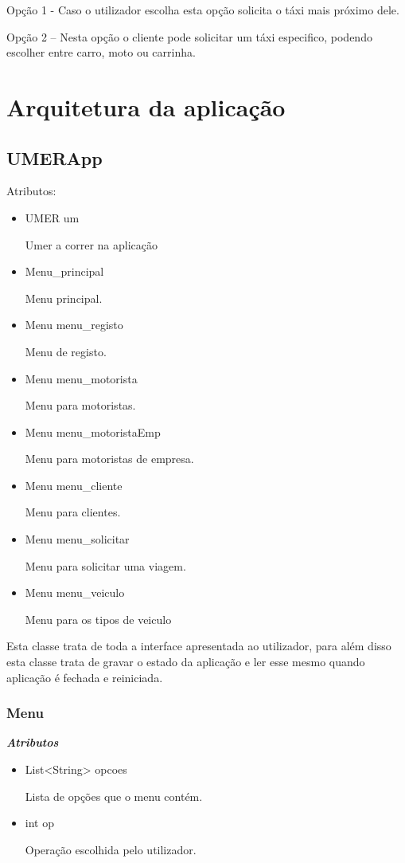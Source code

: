 \documentclass[12pt,a4paper]{report}
\begin{document}
Opção 1 - Caso o utilizador escolha esta opção solicita o táxi mais próximo dele.

Opção 2 – Nesta opção o cliente pode solicitar um táxi especifico, podendo escolher entre carro, moto ou carrinha.

\chapter{Arquitetura da aplicação}
\section{UMERApp}

Atributos:

\begin{itemize}
    \item UMER um \par
Umer a correr na aplicação
    \item Menu\_principal \par
Menu principal.
    \item Menu menu\_registo \par
Menu de registo.
    \item Menu menu\_motorista \par
Menu para motoristas.
    \item Menu menu\_motoristaEmp \par
Menu para motoristas de empresa.
    \item Menu menu\_cliente \par
Menu para clientes.
    \item Menu menu\_solicitar \par
Menu para solicitar uma viagem.
    \item Menu menu\_veiculo \par
Menu para os tipos de veiculo
\end{itemize}

Esta classe trata de toda a interface apresentada ao utilizador, para além disso esta classe trata de gravar o estado da aplicação e ler esse mesmo quando aplicação é fechada e reiniciada. 

\subsection{Menu}
\emph{\bfseries Atributos}
\begin{itemize}
    \item List<String> opcoes \par
Lista de opções que o menu contém.
    \item int op \par
Operação escolhida pelo utilizador.
\end{itemize}
\end{document}
